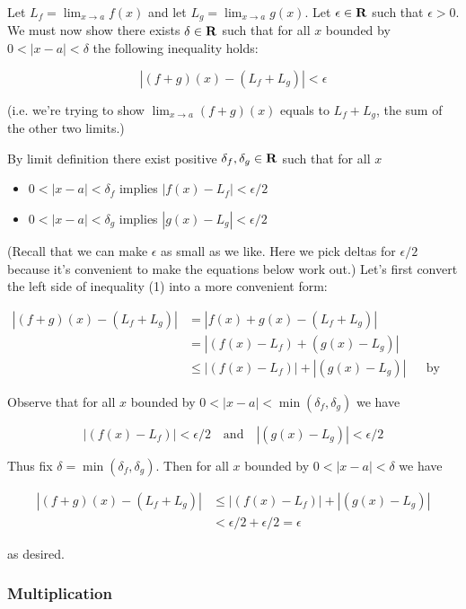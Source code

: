 Let $L_f=\lim_{x\to a}f(x)$ and let $L_g=\lim_{x\to a}g(x)$. Let
$\epsilon\in\mathbf{R}$ such that $\epsilon>0$. We must now show there exists
$\delta\in\mathbf{R}$ such that for all $x$ bounded by $0<|x-a|<\delta$ the following
inequality holds:

\begin{equation}
|(f+g)(x)-(L_f+L_g)|<\epsilon    
\end{equation}

(i.e. we're trying to show $\lim_{x\to a}(f+g)(x)$ equals to $L_f+L_g$, the sum of the other two limits.)

\vs

By limit definition there exist positive $\delta_f, \delta_g\in\mathbf{R}$ such that for all $x$

\begin{itemize}
    \item $0<|x-a|<\delta_f$ implies $|f(x)-L_f|<\epsilon/2$
    \item $0<|x-a|<\delta_g$ implies $|g(x)-L_g|<\epsilon/2$
\end{itemize}

(Recall that we can make $\epsilon$ as small as we like. Here we pick deltas
for $\epsilon/2$ because it's convenient to make the equations below work
out.) Let's first convert the left side of inequality (1) into a more
convenient form:

\begin{align*}
    |(f+g)(x)-(L_f+L_g)|&=|f(x)+g(x)-(L_f+L_g)|\\
    &=|(f(x)-L_f)+(g(x)-L_g)|\\
    &\leq |(f(x)-L_f)|+|(g(x)-L_g)|&&\text{by triangle inequality}
\end{align*}

Observe that for all $x$ bounded by $0<|x-a|<\min(\delta_f, \delta_g)$ we have

\[|(f(x)-L_f)|<\epsilon/2 \ \ \ \text{ and }\ \ \  |(g(x)-L_g)|<\epsilon/2\]

Thus fix $\delta=\min(\delta_f, \delta_g)$. Then for all $x$ bounded by
$0<|x-a|<\delta$ we have

\begin{align*}
    |(f+g)(x)-(L_f+L_g)|&\leq |(f(x)-L_f)|+|(g(x)-L_g)|\\
    &<\epsilon/2+\epsilon/2=\epsilon
\end{align*}

as desired.

\subsubsection*{Multiplication}

